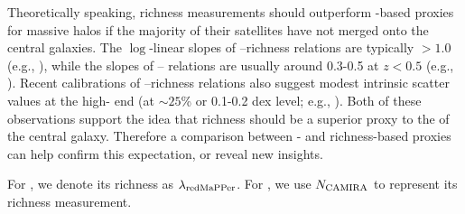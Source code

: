 \documentclass[fleqn,usenatbib,useAMS]{mnras}
\begin{document}
    Theoretically speaking, richness measurements should outperform \mstar{}-based \mvir{} proxies
    for massive halos if the majority of their satellites have not merged onto the central galaxies.
    The $\log$-linear slopes of \mvir{}--richness relations are typically $> 1.0$ (e.g.,
    \citealt{Saro2015, Mantz2016, Farahi2016, Simet2017, Baxter2018, Melchior2017, McClintock2019}),
    while the slopes of \mvir{}--\mstar{} relations are usually around 0.3-0.5 at $z<0.5$ (e.g.,
    \citealt{RodriguezPuebla2017, Tinker2017, Moster2018, Kravtsov2018, Huang2020}).
    Recent calibrations of \mvir{}--richness relations also suggest modest intrinsic scatter values
    at the high-\mvir{} end (at $\sim 25$\% or 0.1-0.2 dex level; e.g., \citealt{Rykoff2014,
    Saro2015, Simet2017}).
    Both of these observations support the idea that richness should be a superior \mvir{} proxy to
    the \mstar{} of the central galaxy.
    Therefore a \topn{} comparison between \mstar{}- and richness-based proxies can help confirm
    this expectation, or reveal new insights.

    For \redm{}, we denote its richness as $\lambda_{\rm redMaPPer}$. 
    For \camira{}, we use $N_{\rm CAMIRA}$ to represent its richness measurement.
\end{document}
